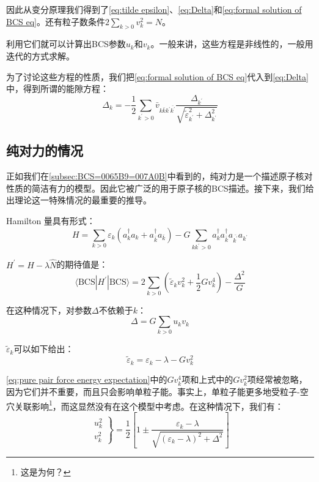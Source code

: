 因此从变分原理我们得到了\ref{eq:tilde epsilon}、\ref{eq:Delta}和\ref{eq:formal solution of BCS eq}。还有粒子数条件$2\sum_{k>0}v^{2}_{k}=N$。

利用它们就可以计算出BCS参数$u_{k}$和$v_{k}$。一般来讲，这些方程是非线性的，一般用迭代的方式求解。

为了讨论这些方程的性质，我们把\ref{eq:formal solution of BCS eq}代入到\ref{eq:Delta}中，得到所谓的能隙方程：
\begin{equation}
\Delta_{k}=-\frac{1}{2}\sum_{k^{\prime}>0}\bar{v}_{k\bar{k}k^{\prime}\bar{k^{\prime}}}\frac{\Delta_{k^{\prime}}}{\sqrt{\tilde{\varepsilon}^{2}_{k^{\prime}}+\Delta^{2}_{k^{\prime}}}}\label{eq:gap equation}
\end{equation}


\subsection{纯对力的情况}

正如我们在\ref{subsec:BCS=0065B9=007A0B}中看到的，纯对力是一个描述原子核对性质的简洁有力的模型。因此它被广泛的用于原子核的BCS描述。接下来，我们给出理论这一特殊情况的最重要的推导。

Hamilton 量具有形式：
\[
H=\sum_{k>0}\varepsilon_{k}(a^{\dagger}_{k}a_{k}+a^{\dagger}_{\bar{k}}a_{\bar{k}})-G\sum_{kk^{\prime}>0}a^{\dagger}_{k}a^{\dagger}_{\bar{k}}a_{\bar{k^{\prime}}}a_{k^{\prime}}
\]

$H^{\prime}=H-\lambda\hat{N}$的期待值是：
\begin{equation}
\langle\text{BCS}|H^{\prime}|\text{BCS}\rangle=2\sum_{k>0}\left(\tilde{\varepsilon}_{k}v^{2}_{k}+\frac{1}{2}Gv^{4}_{k}\right)-\frac{\Delta^{2}}{G}\label{eq:pure pair force energy expectation}
\end{equation}

在这种情况下，对参数$\Delta$不依赖于$k$：
\begin{equation}
\Delta=G\sum_{k>0}u_{k}v_{k}\label{eq:Delta G}
\end{equation}

$\tilde{\varepsilon}_{k}$可以如下给出：
\begin{equation}
\tilde{\varepsilon}_{k}=\varepsilon_{k}-\lambda-Gv^{2}_{k}\label{eq:tilde epsilon G}
\end{equation}

\ref{eq:pure pair force energy expectation}中的$Gv^{4}_{k}$项和上式中的$Gv^{2}_{k}$项经常被忽略，因为它们并不重要，而且只会影响单粒子能。事实上，单粒子能更多地受粒子-空穴关联影响\footnote{这是为何？}，而这显然没有在这个模型中考虑。在这种情况下，我们有：
\begin{equation}
\left.\begin{matrix}u^{2}_{k}\\
v^{2}_{k}
\end{matrix}\right\} =\frac{1}{2}\left[1\pm\frac{\varepsilon_{k}-\lambda}{\sqrt{(\varepsilon_{k}-\lambda)^{2}+\Delta^{2}}}\right]\label{eq:formal solution of BCS equation G}
\end{equation}

